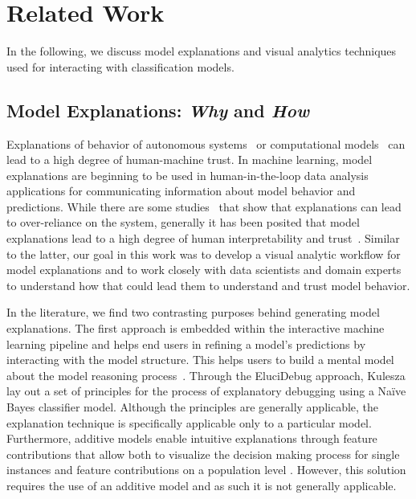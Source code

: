 \section{Related Work}

In the following, we discuss model explanations and visual analytics techniques used for interacting with classification models.

\subsection{Model Explanations: \textit{Why} and \textit{How}}

Explanations of behavior of autonomous systems~\cite{Lim:2009:ADI:1620545.1620576} or computational models~\cite{dasgupta2017familiarity} can lead to a high degree of human-machine trust. In machine learning, model explanations are beginning to be used in human-in-the-loop data analysis applications for communicating information about model behavior and predictions. While there are some studies~\cite{harmful} that show that explanations can lead to over-reliance on the system, generally it has been posited that model explanations lead to a high degree of human interpretability and trust~\cite{lipton2016mythos}. Similar to the latter, our goal in this work was to develop a visual analytic workflow for model explanations and to work closely with data scientists and domain experts to understand how that could lead them to understand and trust model behavior.

In the literature, we find two contrasting purposes behind generating model explanations. The first approach is embedded within the interactive machine learning pipeline and helps end users in refining a model's predictions by interacting with the model structure. This helps users to build a mental model about the model reasoning process~\cite{Kulesza:2015:PED:2678025.2701399}. Through the EluciDebug approach, Kulesza \etal lay out a set of principles for the process of explanatory debugging using a Na\"ive Bayes classifier model.
Although the principles are generally applicable, the explanation technique is specifically applicable only to a particular model.
Furthermore, additive models enable intuitive explanations through feature contributions that allow both to visualize the decision making process for single instances \cite{Poulin:2006:VEE:1597122.1597143} and feature contributions on a population level \cite{Caruana:2015:IMH:2783258.2788613}.
However, this solution requires the use of an additive model and as such it is not generally applicable.

